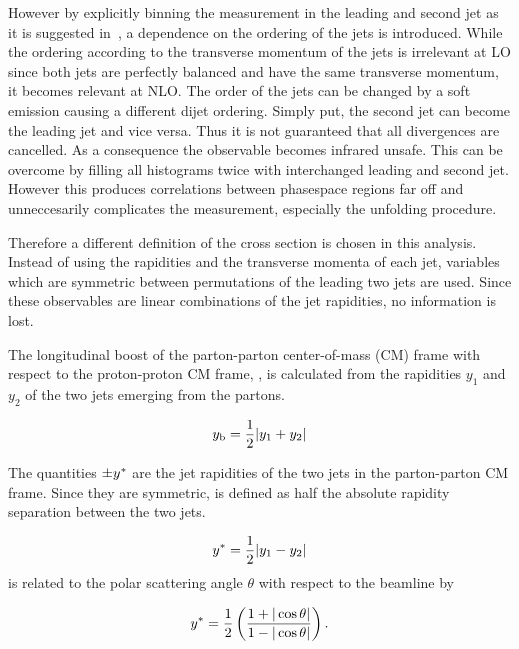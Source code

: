 However by explicitly binning the measurement in the leading and second jet as
it is suggested in~\cite{nigel_theory}, a
dependence on the ordering of the jets is introduced. While the ordering
according to the transverse momentum of the jets is irrelevant at LO
since both jets are perfectly balanced and have the same transverse momentum, it
becomes relevant at NLO. The order of the jets can be changed by a soft emission
causing a different dijet ordering. Simply put, the second jet can become the
leading jet and vice versa. Thus it is not guaranteed that all divergences are
cancelled. As a consequence the observable becomes infrared unsafe. This can be
overcome by filling all histograms twice with interchanged leading and second
jet. However this produces correlations between phasespace regions far off and
unneccesarily complicates the measurement, especially the unfolding procedure.

Therefore a different definition of the cross section is chosen in this
analysis. Instead of using the rapidities and the transverse momenta of each
jet, variables which are symmetric between permutations of the leading two jets
are used. Since these observables are linear combinations of the jet rapidities,
no information is lost.


The longitudinal boost of the parton-parton center-of-mass (CM) frame with
respect to the proton-proton CM frame, \yboost, is calculated from the
rapidities $y_1$ and $y_2$ of the two jets emerging from the partons. 

\begin{equation*}
    y_{\mathrm{b}} = \frac{1}{2} |y_1 + y_2|
\end{equation*}

The quantities $\pm y^*$ are the jet rapidities of the two jets in the
parton-parton CM frame. Since they are symmetric, \ystar is defined as half the
absolute rapidity separation between the two jets.

\begin{equation*}
    y^* = \frac{1}{2} |y_1 - y_2|
\end{equation*}
\ystar is related to the polar scattering angle $\theta$ with respect to the
beamline by 

\begin{equation*}
    y^* = \frac{1}{2} \left( \frac{1 + |\cos \theta|}{1- | \cos \theta|} \right).
\end{equation*}


